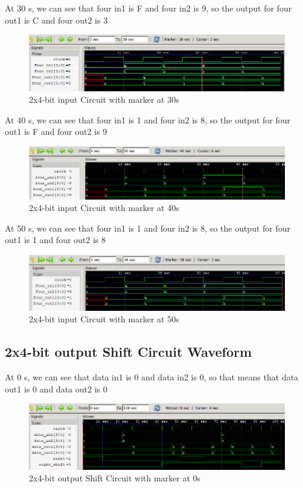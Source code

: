 \documentclass[12pt]{article}
\begin{document}
\newpage

At 30 s, we can see that four in1 is F and four in2 is 9, so the output for four out1 is C and four out2 is 3
\begin{figure}[h]
    \centering
    \includegraphics[width = 1.0\textwidth]{figs/Input30.png}
    \caption{2x4-bit input Circuit with marker at 30s}
    \label{fig:enter-label}
\end{figure}

At 40 s, we can see that four in1 is 1 and four in2 is 8, so the output for four out1 is F and four out2 is 9
\begin{figure}[h]
    \centering
    \includegraphics[width = 1.0\textwidth]{figs/Input40.png}
    \caption{2x4-bit input Circuit with marker at 40s}
    \label{fig:enter-label}
\end{figure}

At 50 s, we can see that four in1 is 1 and four in2 is 8, so the output for four out1 is 1 and four out2 is 8
\begin{figure}[h]
    \centering
    \includegraphics[width = 1.0\textwidth]{figs/Input50.png}
    \caption{2x4-bit input Circuit with marker at 50s}
    \label{fig:enter-label}
\end{figure}

\newpage

\subsection{2x4-bit output Shift Circuit Waveform}

At 0 s, we can see that data in1 is 0 and data in2 is 0, so that means that data out1 is 0 and data out2 is 0
\begin{figure}[h]
    \centering
    \includegraphics[width = 1.0\textwidth]{figs/Shift0.png}
    \caption{2x4-bit output Shift Circuit with marker at 0s}
    \label{fig:enter-label}
\end{figure}
\end{document}
